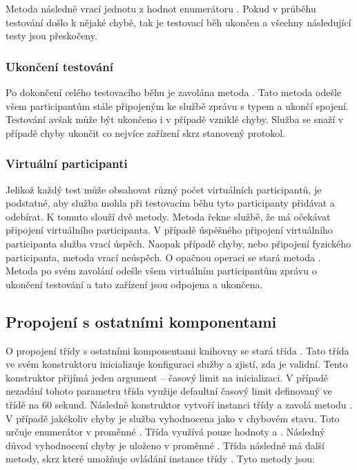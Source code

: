 Metoda následně vrací jednotu z hodnot enumerátoru . Pokud v průběhu testování došlo k nějaké chybě, tak je testovací běh ukončen a všechny následující testy jsou přeskočeny. 

\subsubsection{Ukončení testování}

Po dokončení celého testovacího běhu je zavolána metoda . Tato metoda odešle všem participantům stále připojeným ke službě zprávu s typem  a ukončí spojení. Testování avšak může být ukončeno i v případě vzniklé chyby. Služba se snaží v případě chyby ukončit co nejvíce zařízení skrz stanovený protokol.

\subsubsection{Virtuální participanti}

Jelikož každý test může obsahovat různý počet virtuálních participantů, je podstatné, aby služba mohla při testovacím běhu tyto participanty přidávat a odebírat. K tomuto slouží dvě metody. Metoda  řekne službě, že má očekávat připojení virtuálního participanta. V případě úspěšného připojení virtuálního participanta služba vrací úspěch. Naopak případě chyby, nebo připojení fyzického participanta, metoda vrací neúspěch. O opačnou operaci se stará metoda . Metoda po svém zavolání odešle všem virtuálním participantům zprávu o ukončení testování a tato zařízení jsou odpojena a ukončena.

\subsection{Propojení s ostatními komponentami}

O propojení třídy  s ostatními komponentami knihovny se stará třída .
Tato třída ve svém konstruktoru inicializuje konfiguraci služby a zjistí, zda je validní. Tento konstruktor přijímá jeden argument -- časový limit na inicializaci. V případě nezadání tohoto parametru třída využije defaultní časový limit definovaný ve třídě na 60 sekund. Následně konstruktor vytvoří instanci třídy  a zavolá metodu . V případě jakékoliv chyby je služba vyhodnocena jako v chybovém stavu. Toto určuje enumerátor  v proměnné . Třída využívá pouze hodnoty  a . Následný důvod vyhodnocení chyby je uloženo v proměnné . Třída následně má další metody, skrz které umožňuje ovládání instance třídy . Tyto metody jsou:

